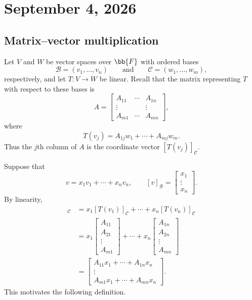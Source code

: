 \section{September 4, 2026}

\subsection{Matrix--vector multiplication}

Let $V$ and $W$ be vector spaces over $\bb{F}$ with ordered bases
\[
  \mathcal B=(v_1,\ldots,v_n)
  \qquad\text{and}\qquad
  \mathcal C=(w_1,\ldots,w_m),
\]
respectively, and let $T\colon V\to W$ be linear. Recall that the matrix
representing $T$ with respect to these bases is
\[
  A=
  \begin{bmatrix}
    A_{11} & \cdots & A_{1n} \\
    \vdots &        & \vdots \\
    A_{m1} & \cdots & A_{mn}
  \end{bmatrix},
\]
where
\[
  T(v_j)=A_{1j}w_1+\cdots+A_{mj}w_m.
\]
Thus the $j$th column of $A$ is the coordinate vector
$[T(v_j)]_{\mathcal C}$.

Suppose that
\[
  v=x_1v_1+\cdots+x_nv_n,
  \qquad
  [v]_{\mathcal B}
  =\begin{bmatrix}x_1\\ \vdots\\ x_n\end{bmatrix}.
\]
By linearity,
\begin{align*}
  [T(v)]_{\mathcal C}
  &=x_1[T(v_1)]_{\mathcal C}+\cdots
    +x_n[T(v_n)]_{\mathcal C} \\
  &=x_1
    \begin{bmatrix}A_{11}\\ A_{21}\\ \vdots\\ A_{m1}\end{bmatrix}
    +\cdots+x_n
    \begin{bmatrix}A_{1n}\\ A_{2n}\\ \vdots\\ A_{mn}\end{bmatrix} \\
  &=
    \begin{bmatrix}
      A_{11}x_1+\cdots+A_{1n}x_n \\
      \vdots \\
      A_{m1}x_1+\cdots+A_{mn}x_n
    \end{bmatrix}.
\end{align*}
This motivates the following definition.

